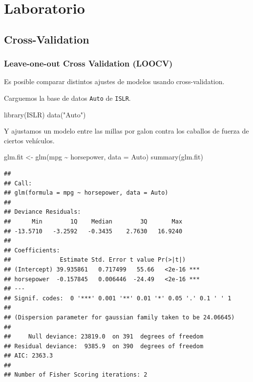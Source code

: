 \documentclass[
  12pt,
]{book}
\newenvironment{Shaded}{\begin{snugshade}}{\end{snugshade}}
\newcommand{\AttributeTok}[1]{\textcolor[rgb]{0.77,0.63,0.00}{#1}}
\newcommand{\FunctionTok}[1]{\textcolor[rgb]{0.00,0.00,0.00}{#1}}
\newcommand{\NormalTok}[1]{#1}
\newcommand{\OtherTok}[1]{\textcolor[rgb]{0.56,0.35,0.01}{#1}}
\newcommand{\SpecialCharTok}[1]{\textcolor[rgb]{0.00,0.00,0.00}{#1}}
\newcommand{\StringTok}[1]{\textcolor[rgb]{0.31,0.60,0.02}{#1}}
\theoremstyle{definition}
\theoremstyle{definition}
\theoremstyle{definition}
\theoremstyle{remark}
\begin{document}
\hypertarget{laboratorio-6}{%
\section{Laboratorio}\label{laboratorio-6}}

\hypertarget{cross-validation}{%
\subsection{Cross-Validation}\label{cross-validation}}

\hypertarget{leave-one-out-cross-validation-loocv}{%
\subsubsection{Leave-one-out Cross Validation (LOOCV)}\label{leave-one-out-cross-validation-loocv}}

Es posible comparar distintos ajustes de modelos usando cross-validation.

Carguemos la base de datos \texttt{Auto} de \texttt{ISLR}.

\begin{Shaded}
\begin{Highlighting}[]
\FunctionTok{library}\NormalTok{(ISLR)}
\FunctionTok{data}\NormalTok{(}\StringTok{"Auto"}\NormalTok{)}
\end{Highlighting}
\end{Shaded}

Y ajustamos un modelo entre las millas por galon contra los caballos de fuerza de ciertos vehículos.

\begin{Shaded}
\begin{Highlighting}[]
\NormalTok{glm.fit }\OtherTok{\textless{}{-}} \FunctionTok{glm}\NormalTok{(mpg }\SpecialCharTok{\textasciitilde{}}\NormalTok{ horsepower, }\AttributeTok{data =}\NormalTok{ Auto)}
\FunctionTok{summary}\NormalTok{(glm.fit)}
\end{Highlighting}
\end{Shaded}

\begin{verbatim}
## 
## Call:
## glm(formula = mpg ~ horsepower, data = Auto)
## 
## Deviance Residuals: 
##      Min        1Q    Median        3Q       Max  
## -13.5710   -3.2592   -0.3435    2.7630   16.9240  
## 
## Coefficients:
##              Estimate Std. Error t value Pr(>|t|)    
## (Intercept) 39.935861   0.717499   55.66   <2e-16 ***
## horsepower  -0.157845   0.006446  -24.49   <2e-16 ***
## ---
## Signif. codes:  0 '***' 0.001 '**' 0.01 '*' 0.05 '.' 0.1 ' ' 1
## 
## (Dispersion parameter for gaussian family taken to be 24.06645)
## 
##     Null deviance: 23819.0  on 391  degrees of freedom
## Residual deviance:  9385.9  on 390  degrees of freedom
## AIC: 2363.3
## 
## Number of Fisher Scoring iterations: 2
\end{verbatim}
\end{document}
